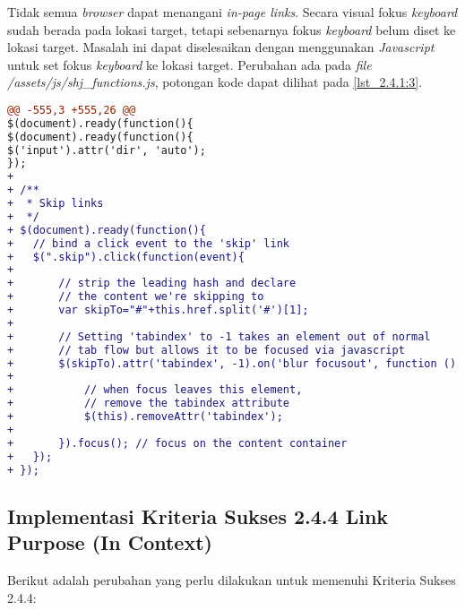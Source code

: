 Tidak semua \textit{browser} dapat menangani \textit{in-page links}. Secara visual fokus \textit{keyboard} sudah berada pada lokasi target, tetapi sebenarnya fokus \textit{keyboard} belum diset ke lokasi target. Masalah ini dapat diselesaikan dengan menggunakan \textit{Javascript} untuk set fokus \textit{keyboard} ke lokasi target. Perubahan ada pada \textit{file} \textit{/assets/js/shj\_functions.js}, potongan kode dapat dilihat pada \ref{lst_2.4.1:3}.

\begin{lstlisting}[language=diff, caption=Perubahan pada \textit{file} \textit{shj\_functions.js}, label=lst_2.4.1:3, basicstyle=\ttfamily, frame=single,
columns=fullflexible, keepspaces=true, breaklines=true]
@@ -555,3 +555,26 @@ 
$(document).ready(function(){
$(document).ready(function(){
$('input').attr('dir', 'auto');
});
+ 
+ /**
+  * Skip links
+  */
+ $(document).ready(function(){
+ 	// bind a click event to the 'skip' link
+ 	$(".skip").click(function(event){
+     
+ 		// strip the leading hash and declare
+ 		// the content we're skipping to
+ 		var skipTo="#"+this.href.split('#')[1];
+ 
+ 		// Setting 'tabindex' to -1 takes an element out of normal 
+ 		// tab flow but allows it to be focused via javascript
+ 		$(skipTo).attr('tabindex', -1).on('blur focusout', function () {
+ 
+ 			// when focus leaves this element, 
+ 			// remove the tabindex attribute
+ 			$(this).removeAttr('tabindex');
+ 
+ 		}).focus(); // focus on the content container
+ 	});
+ });
\end{lstlisting}

\subsection{Implementasi Kriteria Sukses 2.4.4 Link Purpose (In Context)}
\label{subsec:implementasi_A_2.4.4}

Berikut adalah perubahan yang perlu dilakukan untuk memenuhi Kriteria Sukses 2.4.4:

